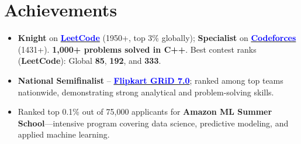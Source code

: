 \documentclass[letterpaper,11pt]{article}
\begin{document}
\section{Achievements}
\begin{itemize}[leftmargin=0.15in, topsep=1pt, itemsep=0pt, parsep=0pt]
  \item\normalsize
    \textbf{Knight} on \href{https://leetcode.com/u/_Ankitkumarsingh/}{\textbf{\textcolor{blue}{LeetCode}}} (1950+, top 3\% globally); \textbf{Specialist} on \href{https://codeforces.com/profile/ankitmwd1501}{\textbf{\textcolor{blue}{Codeforces}}} (1431+). \textbf{1{,}000+ problems solved in C++}. Best contest ranks (\textbf{LeetCode}): Global \textbf{85}, \textbf{192}, and \textbf{333}.
  \item\normalsize
    \textbf{National Semifinalist} -- \href{https://drive.google.com/file/d/1iF6-lHqZ1V8cvDpj5MuHtBvnmj-VWHdy/view?usp=drive_link}{\textbf{\textcolor{blue}{Flipkart GRiD 7.0}}}; ranked among top teams nationwide, demonstrating strong analytical and problem-solving skills.
  \item\normalsize
    Ranked top 0.1\% out of 75{,}000 applicants for \textbf{Amazon ML Summer School}---intensive program covering data science, predictive modeling, and applied machine learning.
\end{itemize}
\end{document}
